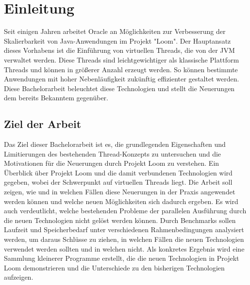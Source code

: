 \chapter{Einleitung}
\label{cha:Einleitung}

    Seit einigen Jahren arbeitet Oracle an Möglichkeiten zur Verbesserung der Skalierbarkeit von Java-Anwendungen im Projekt "Loom".
    Der Hauptansatz dieses Vorhabens ist die Einführung von virtuellen Threads, die von der JVM verwaltet werden. 
    Diese Threads sind leichtgewichtiger als klassische Plattform Threads und können in größerer Anzahl erzeugt werden.
    So können bestimmte Anwendungen mit hoher Nebenläufigkeit zukünftig effizienter gestaltet werden. Diese Bachelorarbeit 
    beleuchtet diese Technologien und stellt die Neuerungen dem bereits Bekanntem gegenüber.

\section{Ziel der Arbeit}
\label{sec:Ziel}

    Das Ziel dieser Bachelorarbeit ist es, die grundlegenden Eigenschaften und Limitierungen des bestehenden Thread-Konzepts zu untersuchen und die Motivationen für die Neuerungen
    durch Projekt Loom zu verstehen. Ein Überblick über Projekt Loom und die damit verbundenen Technologien wird gegeben, wobei der Schwerpunkt auf virtuellen Threads liegt. 
    Die Arbeit soll zeigen, wie und in welchen Fällen diese Neuerungen in der Praxis angewendet werden können und welche neuen Möglichkeiten sich dadurch ergeben. 
    Es wird auch verdeutlicht, welche bestehenden Probleme der parallelen Ausführung durch die neuen Technologien nicht gelöst werden können. 
    Durch Benchmarks sollen Laufzeit und Speicherbedarf unter verschiedenen Rahmenbedingungen analysiert werden, um daraus Schlüsse zu ziehen, 
    in welchen Fällen die neuen Technologien verwendet werden sollten und in welchen nicht. Als konkretes Ergebnis wird eine Sammlung kleinerer Programme erstellt, 
    die die neuen Technologien in Projekt Loom demonstrieren und die Unterschiede zu den bisherigen Technologien aufzeigen.



